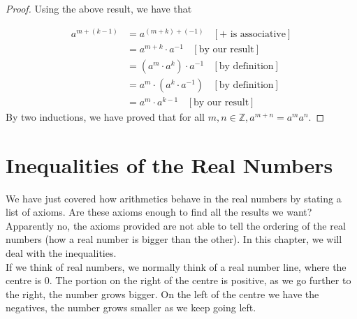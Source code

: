 \documentclass{book}
\begin{document}
\begin{proof}
    Using the above result, we have that
    
    \begin{align*}
        a^{m + (k - 1)} & = a^{(m + k) + (-1)} \ \ \ \ [+ \text{ is associative}] \\
        & = a^{m + k} \cdot a^{-1} \ \ \ \ [\text{by our result}] \\
        & = (a^{m} \cdot a^{k}) \cdot a^{-1} \ \ \ \ [\text{by definition}] \\
        & = a^{m} \cdot (a^{k} \cdot a^{-1}) \ \ \ \ [\text{by definition}] \\
        & = a^{m} \cdot a^{k-1} \ \ \ \ [\text{by our result}]
    \end{align*}
    By two inductions, we have proved that for all $m, n \in \mathbb{Z}, a^{m + n} = a^{m}a^{n}$.
    
\end{proof}

\section{Inequalities of the Real Numbers}
We have just covered how arithmetics behave in the real numbers by stating a list of axioms. Are these axioms enough to find all the results we want? Apparently no, the axioms provided are not able to tell the ordering of the real numbers (how a real number is bigger than the other). In this chapter, we will deal with the inequalities. \\
If we think of real numbers, we normally think of a real number line, where the centre is 0. The portion on the right of the centre is positive, as we go further to the right, the number grows bigger. On the left of the centre we have the negatives, the number grows smaller as we keep going left.

\begin{center}
\end{center}
\end{document}
